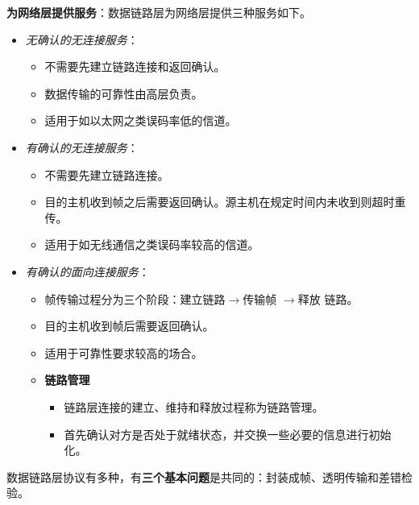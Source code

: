 \documentclass[b5paper, twoside]{article}
\let\oldtextbf\textbf
\renewcommand{\textbf}[1]{\textcolor{myblue}{\oldtextbf{#1}}}
\let\oldemph\emph
\renewcommand{\emph}[1]{{\oldemph{#1}}}
\begin{document}
\textbf{为网络层提供服务}：数据链路层为网络层提供三种服务如下。
\begin{itemize}
	\item \emph{无确认的无连接服务}：
	\begin{itemize}
		\item 不需要先建立链路连接和返回确认。
		\item 数据传输的可靠性由高层负责。
		\item 适用于如以太网之类误码率低的信道。
	\end{itemize}
	\item \emph{有确认的无连接服务}：
	\begin{itemize}
		\item 不需要先建立链路连接。
		\item 目的主机收到帧之后需要返回确认。源主机在规定时间内未收到则超时重传。
		\item 适用于如无线通信之类误码率较高的信道。
	\end{itemize}
	\item \emph{有确认的面向连接服务}：
	\begin{itemize}
		\item 帧传输过程分为三个阶段：建立链路$\rightarrow$传输帧 $\rightarrow$释放
		链路。
		\item 目的主机收到帧后需要返回确认。
		\item 适用于可靠性要求较高的场合。
		\item \textbf{链路管理}
		\begin{itemize}
			\item 链路层连接的建立、维持和释放过程称为链路管理。
			\item 首先确认对方是否处于就绪状态，并交换一些必要的信息进行初始化。
		\end{itemize}
	\end{itemize}
\end{itemize}

数据链路层协议有多种，有\textbf{三个基本问题}是共同的：封装成帧、透明传输和差错检验。
\end{document}

